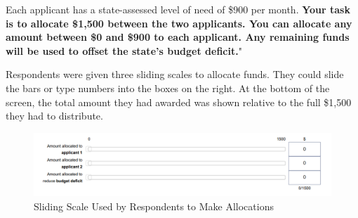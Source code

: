 \documentclass[12pt]{article}%
\begin{document}
\begin{doublespace}
Each applicant has a state-assessed level of need of \$900 per month. \textbf{Your task is to allocate \$1,500 between the two applicants. You can allocate any amount between \$0 and \$900 to each applicant. Any remaining funds will be used to offset the state’s budget deficit.}"

Respondents were given three sliding scales to allocate funds. They could slide the bars or type numbers into the boxes on the right. At the bottom of the screen, the total amount they had awarded was shown relative to the full \$1,500 they had to distribute.

\begin{figure}[h!]
	\centering
	\includegraphics[scale=1]{figs/sliding-scale.png}
	\caption{Sliding Scale Used by Respondents to Make Allocations}
	\label{}
\end{figure}




\end{doublespace}
\end{document}
